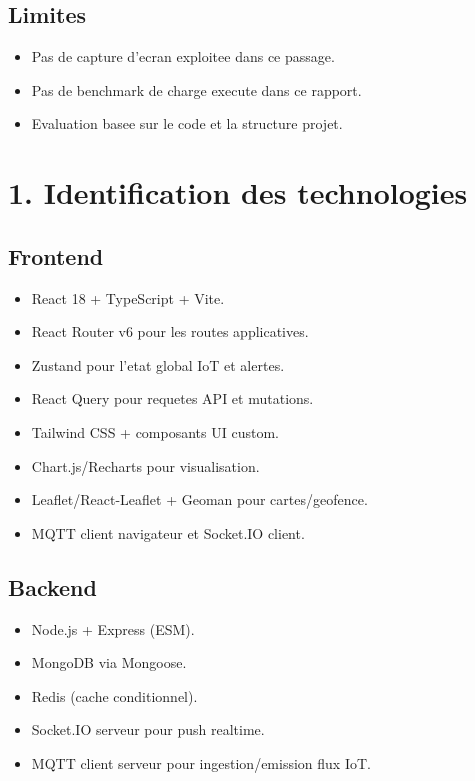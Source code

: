 \documentclass[12pt,a4paper]{article}
\begin{document}
\subsection{Limites}
\begin{itemize}
  \item Pas de capture d'ecran exploitee dans ce passage.
  \item Pas de benchmark de charge execute dans ce rapport.
  \item Evaluation basee sur le code et la structure projet.
\end{itemize}

\section{1. Identification des technologies}
\subsection{Frontend}
\begin{itemize}
  \item React 18 + TypeScript + Vite.
  \item React Router v6 pour les routes applicatives.
  \item Zustand pour l'etat global IoT et alertes.
  \item React Query pour requetes API et mutations.
  \item Tailwind CSS + composants UI custom.
  \item Chart.js/Recharts pour visualisation.
  \item Leaflet/React-Leaflet + Geoman pour cartes/geofence.
  \item MQTT client navigateur et Socket.IO client.
\end{itemize}

\subsection{Backend}
\begin{itemize}
  \item Node.js + Express (ESM).
  \item MongoDB via Mongoose.
  \item Redis (cache conditionnel).
  \item Socket.IO serveur pour push realtime.
  \item MQTT client serveur pour ingestion/emission flux IoT.
\end{itemize}
\end{document}
